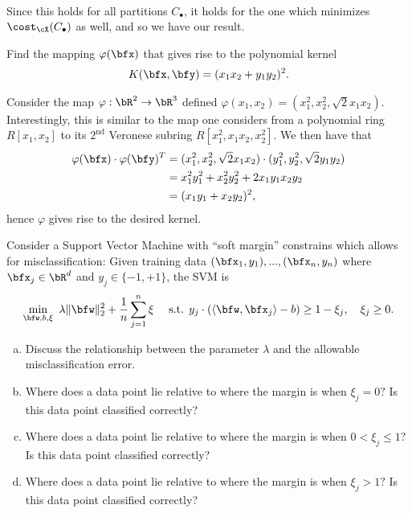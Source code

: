 \begin{homework}[e]
\begin{prf}
\begin{align*}
    \end{align*}
    Since this holds for all partitions $C_\bullet$, it holds for the one which minimizes $\cost_\cX(C_\bullet)$ as well, and so we have our result.
  \end{prf}
   Find the mapping $\varphi(\bfx)$ that gives rise to the polynomial kernel \begin{align*}
    K(\bfx, \bfy) = (x_1x_2 + y_1y_2)^2.
  \end{align*}
  \begin{prf}
    Consider the map $\varphi:\bR^2 \to \bR^3$ defined $\varphi(x_1,x_2) = (x_1^2, x_2^2, \sqrt{2}x_1x_2)$. Interestingly, this is similar to the map one considers from a polynomial ring $R[x_1,x_2]$ to its $2^{\text{nd}}$ Veronese subring $R[x_1^2,x_1x_2,x_2^2]$. We then have that
    \begin{align*}
      \varphi(\bfx)\cdot \varphi(\bfy)^T
        &= (x_1^2,x_2^2,\sqrt{2}x_1x_2) \cdot (y_1^2,y_2^2, \sqrt{2}y_1y_2) \\
        &= x_1^2y_1^2 + x_2^2y_2^2 + 2x_1y_1x_2y_2 \\
        &= (x_1y_1 + x_2y_2)^2,
    \end{align*}
    hence $\varphi$ gives rise to the desired kernel.
  \end{prf}
   Consider a Support Vector Machine with ``soft margin'' constrains which allows for misclassification: Given training data $(\bfx_1,y_1),...,(\bfx_n,y_n)$ where $\bfx_j \in \bR^d$ and $y_j \in \{-1, +1\}$, the SVM is
  \begin{align*}
    \min_{\bfw, b,\xi} ~ \lambda\|\bfw\|^2_2 + \frac{1}{n}\sum_{j=1}^n \xi \hspace{1em} \text{ s.t. } y_j\cdot (\langle \bfw,\bfx_j \rangle - b)\geq 1 - \xi_j, \hspace{1em} \xi_j \geq 0.
  \end{align*}
    \begin{enumerate}[(a)]
      \item Discuss the relationship between the parameter $\lambda$ and the allowable misclassification error.
      \item Where does a data point lie relative to where the margin is when $\xi_j = 0?$ Is this data point classified correctly?
      \item Where does a data point lie relative to where the margin is when $0 < \xi_j \leq 1?$ Is this data point classified correctly?
      \item Where does a data point lie relative to where the margin is when $\xi_j > 1?$ Is this data point classified correctly?

\end{enumerate}
\end{homework}
